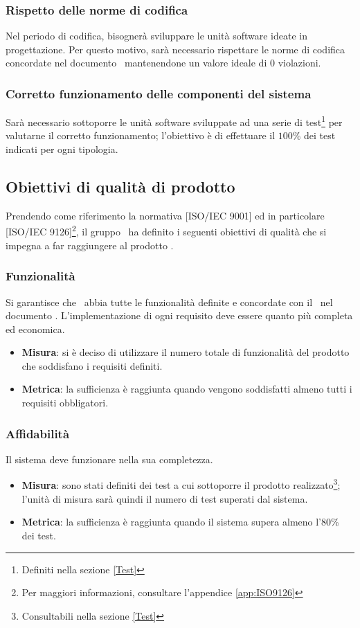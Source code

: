 \documentclass[../PianoDiQualifica.tex]{subfiles}
\begin{document}
			\subsubsection{Rispetto delle norme di codifica}
				Nel periodo di codifica, bisognerà sviluppare le unità software ideate in
				progettazione. Per questo motivo, sarà necessario rispettare le norme di codifica
				concordate nel documento \normediprogetto\ mantenendone un valore ideale di $0$
				violazioni.
			\subsubsection{Corretto funzionamento delle componenti del sistema}
				Sarà necessario sottoporre le unità software sviluppate ad una serie di test\footnote{Definiti nella sezione \ref{Test}}
				per valutarne il corretto funzionamento;
				l'obiettivo è di effettuare il $100\%$ dei test indicati per ogni tipologia.
		\subsection{Obiettivi di qualità di prodotto}
			Prendendo come riferimento la normativa [ISO/IEC 9001] ed in particolare
			[ISO/IEC 9126]\footnote{Per maggiori informazioni, consultare l'appendice
			\ref{app:ISO9126}}, il gruppo \kaleidoscode\ ha definito i seguenti obiettivi di
			qualità che si impegna a far raggiungere al prodotto \progetto.
			\subsubsection{Funzionalità}
				Si garantisce che \progetto\ abbia tutte le funzionalità
				definite e concordate con il \proponente\ nel documento
				\analisideirequisitiv. L'implementazione di
				ogni requisito deve essere quanto più completa ed economica.
				\begin{itemize}
					\item \textbf{Misura}: si è deciso di utilizzare il numero totale di
					funzionalità del prodotto che soddisfano i requisiti definiti.
					\item \textbf{Metrica}: la sufficienza è raggiunta quando
					vengono soddisfatti almeno tutti i requisiti obbligatori.
				\end{itemize}
			\subsubsection{Affidabilità}
				Il sistema deve funzionare nella sua completezza.
				\begin{itemize}
					\item \textbf{Misura}: sono stati definiti dei test a cui sottoporre
					il prodotto realizzato\footnote{Consultabili nella sezione \ref{Test}};
					l'unità di misura sarà quindi il numero di test	superati dal sistema.
					\item \textbf{Metrica}: la sufficienza è raggiunta quando il sistema supera
					almeno l'$80$\% dei test.
				\end{itemize}
\end{document}
